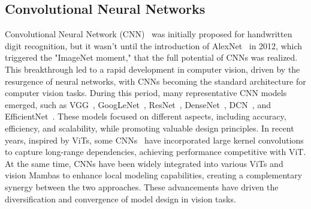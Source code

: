 \subsection{Convolutional Neural Networks}
Convolutional Neural Network (CNN)~\cite{cnn} was initially proposed for handwritten digit recognition, but it wasn't until the introduction of AlexNet~\cite{alexnet} in 2012, which triggered the "ImageNet moment," that the full potential of CNNs was realized. This breakthrough led to a rapid development in computer vision, driven by the resurgence of neural networks, with CNNs becoming the standard architecture for computer vision tasks. During this period, many representative CNN models emerged, such as VGG~\cite{vgg}, GoogLeNet~\cite{googlenet}, ResNet~\cite{resnet}, DenseNet~\cite{densenet}, DCN~\cite{dgcnet,internimage}, and EfficientNet~\cite{efficientnet}. These models focused on different aspects, including accuracy, efficiency, and scalability, while promoting valuable design principles. In recent years, inspired by ViTs, some CNNs~\cite{convnet,convnextv2,RepLKNet,SLaK} have incorporated large kernel convolutions to capture long-range dependencies, achieving performance competitive with ViT. At the same time, CNNs have been widely integrated into various ViTs and vision Mambas to enhance local modeling capabilities, creating a complementary synergy between the two approaches. These advancements have driven the diversification and convergence of model design in vision tasks.